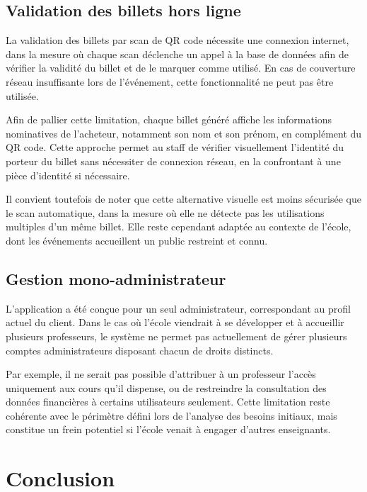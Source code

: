 \documentclass{article}
\begin{document}
\subsection{Validation des billets hors ligne}

La validation des billets par scan de QR code nécessite 
une connexion internet, dans la mesure où chaque scan 
déclenche un appel à la base de données afin de vérifier 
la validité du billet et de le marquer comme utilisé. 
En cas de couverture réseau insuffisante lors de 
l'événement, cette fonctionnalité ne peut pas être utilisée.

Afin de pallier cette limitation, chaque billet généré 
affiche les informations nominatives de l'acheteur, 
notamment son nom et son prénom, en complément du QR code. 
Cette approche permet au staff de vérifier visuellement 
l'identité du porteur du billet sans nécessiter de 
connexion réseau, en la confrontant à une pièce d'identité 
si nécessaire.

Il convient toutefois de noter que cette alternative 
visuelle est moins sécurisée que le scan automatique, 
dans la mesure où elle ne détecte pas les utilisations 
multiples d'un même billet. Elle reste cependant 
adaptée au contexte de l'école, dont les événements 
accueillent un public restreint et connu.

\subsection{Gestion mono-administrateur}

L'application a été conçue pour un seul administrateur, 
correspondant au profil actuel du client. Dans le cas où 
l'école viendrait à se développer et à accueillir plusieurs 
professeurs, le système ne permet pas actuellement de gérer 
plusieurs comptes administrateurs disposant chacun de droits 
distincts.

Par exemple, il ne serait pas possible d'attribuer à un 
professeur l'accès uniquement aux cours qu'il dispense, ou 
de restreindre la consultation des données financières à 
certains utilisateurs seulement. Cette limitation reste 
cohérente avec le périmètre défini lors de l'analyse des 
besoins initiaux, mais constitue un frein potentiel si 
l'école venait à engager d'autres enseignants.

\section{Conclusion}
\end{document}
